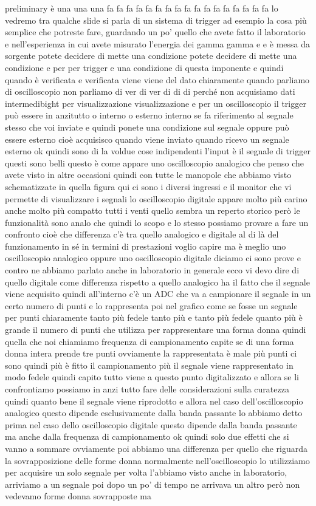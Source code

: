 {preliminary è una una una fa fa fa fa fa fa fa fa fa fa fa fa fa fa fa fa fa lo vedremo tra qualche slide si parla di un sistema di trigger ad esempio la cosa più semplice che potreste fare, guardando un po' quello che avete fatto il laboratorio e nell'esperienza in cui avete misurato l'energia dei gamma gamma e e è messa da sorgente potete decidere di mette una condizione potete decidere di mette una condizione e per per trigger e una condizione di questa imponente e quindi quando è verificata e verificata viene viene del dato chiaramente quando parliamo di oscilloscopio non parliamo di ver di ver di di di perché non acquisiamo dati intermedibight per visualizzazione visualizzazione e per un oscilloscopio il trigger può essere in anzitutto o interno o esterno interno se fa riferimento al segnale stesso che voi inviate e quindi ponete una condizione sul segnale oppure può essere esterno cioè acquisisco quando viene inviato quando ricevo un segnale esterno ok quindi sono di la voldue cose indipendenti l'input è il segnale di trigger questi sono belli questo è come appare uno oscilloscopio analogico che penso che avete visto in altre occasioni quindi con tutte le manopole che abbiamo visto schematizzate in quella figura qui ci sono i diversi ingressi e il monitor che vi permette di visualizzare i segnali lo oscilloscopio digitale appare molto più carino anche molto più compatto tutti i venti quello sembra un reperto storico però le funzionalità sono analo che quindi lo scopo e lo stesso possiamo provare a fare un confronto cioè che differenza c'è tra quello analogico e digitale al di là del funzionamento in sé in termini di prestazioni voglio capire ma è meglio uno oscilloscopio analogico oppure uno oscilloscopio digitale diciamo ci sono prove e contro ne abbiamo parlato anche in laboratorio in generale ecco vi devo dire di quello digitale come differenza rispetto a quello analogico ha il fatto che il segnale viene acquisito quindi all'interno c'è un ADC che va a campionare il segnale in un certo numero di punti e lo rappresenta poi nel grafico come se fosse un segnale per punti chiaramente tanto più fedele tanto più e tanto più fedele quanto più è grande il numero di punti che utilizza per rappresentare una forma donna quindi quella che noi chiamiamo frequenza di campionamento capite se di una forma donna intera prende tre punti ovviamente la rappresentata è male più punti ci sono quindi più è fitto il campionamento più il segnale viene rappresentato in modo fedele quindi capito tutto viene a questo punto digitalizzato e allora se li confrontiamo possiamo in anzi tutto fare delle considerazioni sulla curatezza quindi quanto bene il segnale viene riprodotto e allora nel caso dell'oscilloscopio analogico questo dipende esclusivamente dalla banda passante lo abbiamo detto prima nel caso dello oscilloscopio digitale questo dipende dalla banda passante ma anche dalla frequenza di campionamento ok quindi solo due effetti che si vanno a sommare ovviamente poi abbiamo una differenza per quello che riguarda la sovrapposizione delle forme donna normalmente nell'oscilloscopio lo utilizziamo per acquisire un solo segnale per volta l'abbiamo visto anche in laboratorio, arriviamo a un segnale poi dopo un po' di tempo ne arrivava un altro però non vedevamo forme donna sovrapposte ma }
